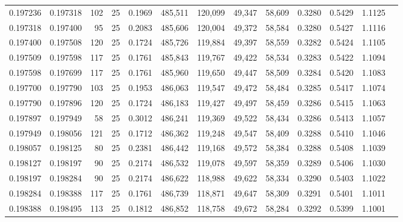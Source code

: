 \begin{tabular}{rrrrrrrrrrrrr}
0.197236 & 0.197318 &   102 &  25 &                                     0.1969 & 485,511 & 120,099 &  49,347 &  58,609 & 0.3280 & 0.5429 & 1.1125 \\
0.197318 & 0.197400 &    95 &  25 &                                     0.2083 & 485,606 & 120,004 &  49,372 &  58,584 & 0.3280 & 0.5427 & 1.1116 \\
0.197400 & 0.197508 &   120 &  25 &                                     0.1724 & 485,726 & 119,884 &  49,397 &  58,559 & 0.3282 & 0.5424 & 1.1105 \\
0.197509 & 0.197598 &   117 &  25 &                                     0.1761 & 485,843 & 119,767 &  49,422 &  58,534 & 0.3283 & 0.5422 & 1.1094 \\
0.197598 & 0.197699 &   117 &  25 &                                     0.1761 & 485,960 & 119,650 &  49,447 &  58,509 & 0.3284 & 0.5420 & 1.1083 \\
0.197700 & 0.197790 &   103 &  25 &                                     0.1953 & 486,063 & 119,547 &  49,472 &  58,484 & 0.3285 & 0.5417 & 1.1074 \\
0.197790 & 0.197896 &   120 &  25 &                                     0.1724 & 486,183 & 119,427 &  49,497 &  58,459 & 0.3286 & 0.5415 & 1.1063 \\
0.197897 & 0.197949 &    58 &  25 &                                     0.3012 & 486,241 & 119,369 &  49,522 &  58,434 & 0.3286 & 0.5413 & 1.1057 \\
0.197949 & 0.198056 &   121 &  25 &                                     0.1712 & 486,362 & 119,248 &  49,547 &  58,409 & 0.3288 & 0.5410 & 1.1046 \\
0.198057 & 0.198125 &    80 &  25 &                                     0.2381 & 486,442 & 119,168 &  49,572 &  58,384 & 0.3288 & 0.5408 & 1.1039 \\
0.198127 & 0.198197 &    90 &  25 &                                     0.2174 & 486,532 & 119,078 &  49,597 &  58,359 & 0.3289 & 0.5406 & 1.1030 \\
0.198197 & 0.198284 &    90 &  25 &                                     0.2174 & 486,622 & 118,988 &  49,622 &  58,334 & 0.3290 & 0.5403 & 1.1022 \\
0.198284 & 0.198388 &   117 &  25 &                                     0.1761 & 486,739 & 118,871 &  49,647 &  58,309 & 0.3291 & 0.5401 & 1.1011 \\
0.198388 & 0.198495 &   113 &  25 &                                     0.1812 & 486,852 & 118,758 &  49,672 &  58,284 & 0.3292 & 0.5399 & 1.1001 \\

\end{tabular}
